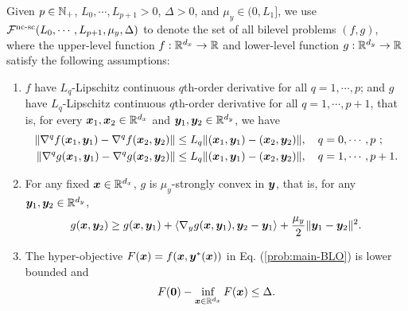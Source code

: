\documentclass{article}
\begin{document}
\begin{dfn} \label{dfn:NC-SC-func}
Given $p \in {\mathbb{N}}_+$, $L_0, \cdots,L_{p+1} >0$, $\Delta>0$, and $\mu_y \in (0,L_1]$, 
we use ${\mathcal{F}}^{\text{nc-sc}}(L_0,\cdots,L_{p+1},\mu_y, \Delta)$ to denote the set of all bilevel problems $(f,g)$, where the upper-level function $f:{\mathbb{R}}^{d_x} \rightarrow {\mathbb{R}}$ and lower-level function $g: {\mathbb{R}}^{d_y} \rightarrow {\mathbb{R}}$ satisfy the following assumptions:
\begin{enumerate}
    \item $f$ have $L_q$-Lipschitz continuous $q$th-order derivative for all $q = 1,\cdots,p$; and $g$ have $L_q$-Lipschitz continuous $q$th-order derivative for all $q = 1,\cdots,p+1$, that is, for every ${\bm{x}}_1, {\bm{x}}_2 \in {\mathbb{R}}^{d_x}$ and ${\bm{y}}_1,{\bm{y}}_2 \in {\mathbb{R}}^{d_y}$, we have
    \begin{align*}
        \Vert \nabla^q f({\bm{x}}_1,{\bm{y}}_1) - \nabla^q f({\bm{x}}_2,{\bm{y}}_2) \Vert &\le L_q \Vert ({\bm{x}}_1,{\bm{y}}_1) - ({\bm{x}}_2,{\bm{y}}_2) \Vert, \quad q=0,\cdots,p~; \\
        \Vert \nabla^q g({\bm{x}}_1,{\bm{y}}_1) - \nabla^q g({\bm{x}}_2,{\bm{y}}_2) \Vert &\le L_q \Vert ({\bm{x}}_1,{\bm{y}}_1) - ({\bm{x}}_2,{\bm{y}}_2) \Vert, \quad q=1,\cdots,p+1.
    \end{align*}
    \item For any fixed ${\bm{x}} \in {\mathbb{R}}^{d_x}$, $g$ is $\mu_y$-strongly convex in ${\bm{y}}$, that is, for any ${\bm{y}}_1,{\bm{y}}_2 \in {\mathbb{R}}^{d_y}$,
    \begin{align*}
        g({\bm{x}},{\bm{y}}_2) \ge g({\bm{x}},{\bm{y}}_1) + \langle \nabla_y g({\bm{x}},{\bm{y}}_1), {\bm{y}}_2 - {\bm{y}}_1 \rangle + \frac{\mu_y}{2} \Vert {\bm{y}}_1 - {\bm{y}}_2 \Vert^2.
    \end{align*}
    \item The hyper-objective $F({\bm{x}}) = f({\bm{x}},{\bm{y}}^*({\bm{x}}))$ in Eq. (\ref{prob:main-BLO}) is lower bounded and 
    \begin{align*}
        F({\bm{0}}) - \inf_{{\bm{x}} \in {\mathbb{R}}^{d_x}} F({\bm{x}}) \le \Delta.
    \end{align*}
\end{enumerate}
\end{dfn}
\end{document}
